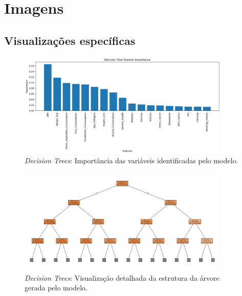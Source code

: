 \chapter{Imagens}
\label{chap:appendix}

\section{Visualizações específicas}

\begin{figure}[H]
    \centering
    \includegraphics[width=0.9\textwidth]{images/feature_importance.png}
    \caption{\textit{Decision Trees}: Importância das variáveis identificadas pelo modelo.}
    \label{fig:feature_importance}
\end{figure}

\begin{figure}[H]
    \centering
    \includegraphics[width=0.9\textwidth]{images/decision_tree_structure.png}
    \caption{\textit{Decision Trees}: Visualização detalhada da estrutura da árvore gerada pelo modelo.}
    \label{fig:decision_tree_structure}
\end{figure}

